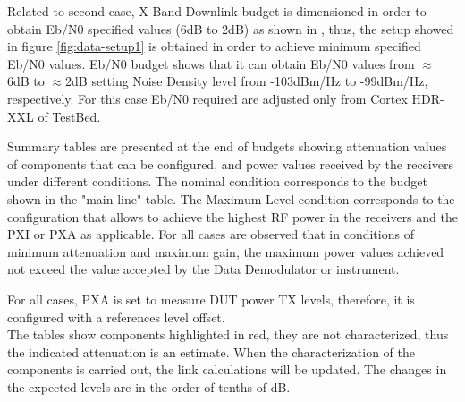 Related to second case, X-Band Downlink budget is dimensioned in order to obtain Eb/N0 specified 
values (6dB to 2dB) as shown in , thus, the setup showed in figure 
\ref{fig:data-setup1} is obtained in order to achieve minimum specified Eb/N0 values. Eb/N0 
budget shows that it can obtain Eb/N0 values from $\approx$ 6dB to $\approx$2dB setting Noise Density level 
from -103dBm/Hz to -99dBm/Hz, respectively. For this case Eb/N0 required are adjusted only 
from Cortex HDR-XXL of TestBed. %
\vspace{0.5cm}


Summary tables are presented at the end of budgets showing attenuation values of components 
that can be configured, and power values received by the receivers under different conditions. 
The nominal condition corresponds to the budget shown in the "main line" table. The Maximum 
Level condition corresponds to the configuration that allows to achieve the highest RF power
 in the receivers and the PXI or PXA as applicable. For all cases are observed that in conditions of minimum 
 attenuation and maximum gain, the maximum power values achieved not exceed the value accepted
  by the Data Demodulator or instrument.\\
  \vspace{0.5cm}

For all cases, PXA is set to measure DUT power TX levels, therefore, it is configured with a 
references level offset.\\
\vspace{0.5cm}
The tables show components highlighted in red, they are not characterized, 
thus the indicated attenuation is an estimate. When the characterization 
of the components is carried out, the link calculations will be updated. 
The changes in the expected levels are in the order of tenths of dB.

%

